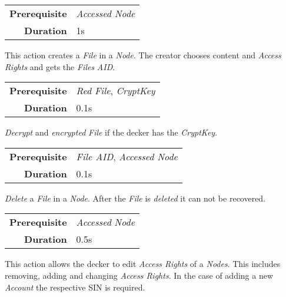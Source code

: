 \begin{tabular}{rl}
    \textbf{Prerequisite} & \emph{Accessed Node} \\
    \textbf{Duration}     & 1s                   \\
\end{tabular}

\hfill

This action creates a \emph{File} in a \emph{Node}. The creator chooses content and
\emph{Access Rights} and gets the \emph{Files} \emph{AID}.

\label{par:decrypt}

\begin{tabular}{rl}
    \textbf{Prerequisite} & \emph{Red File}, \emph{CryptKey} \\
    \textbf{Duration}     & 0.1s                             \\
\end{tabular}

\hfill

\emph{Decrypt} and \emph{encrypted} \emph{File} if the decker has the \emph{CryptKey}.

\label{par:delete file}

\begin{tabular}{rl}
    \textbf{Prerequisite} & \emph{File AID}, \emph{Accessed Node} \\
    \textbf{Duration}     & 0.1s                                  \\
\end{tabular}

\hfill

\emph{Delete} a \emph{File} in a \emph{Node}. After the \emph{File} is
\emph{deleted} it can not be recovered.

\label{par:edit access rights}


\begin{tabular}{rl}
    \textbf{Prerequisite} & \emph{Accessed} \emph{Node} \\
    \textbf{Duration}     & 0.5s                        \\
\end{tabular}

\hfill

This action allows the decker to edit \emph{Access Rights} of a \emph{Nodes}. This
includes removing, adding and changing \emph{Access Rights}. In the case of adding
a new \emph{Account} the respective SIN is required.

